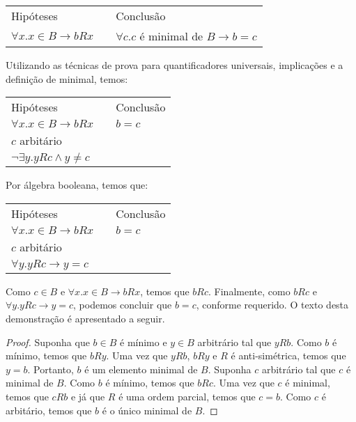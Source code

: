 \vspace{1cm}

\begin{tabular}{lcl}
 Hip\'oteses & \hspace{3cm} & Conclusão\\
 $\forall x. x \in B \rightarrow bRx$ & & $\forall c. c$ \'e minimal de $B \rightarrow b = c$\\
 \end{tabular}
\vspace{1cm}

Utilizando as t\'ecnicas de prova para quantificadores universais, implica\c{c}\~oes e a defini\c{c}\~ao de minimal, temos:

\vspace{1cm}

\begin{tabular}{lcl}
 Hip\'oteses & \hspace{3cm} & Conclusão\\
 $\forall x. x \in B \rightarrow bRx$ & & $b = c$\\
 $c$ arbit\'ario & & \\
 $\neg \exists y. yRc \land y \neq c$ & &
 \end{tabular}
\vspace{1cm}

Por \'algebra booleana, temos que:

\vspace{1cm}

\begin{tabular}{lcl}
 Hip\'oteses & \hspace{3cm} & Conclusão\\
 $\forall x. x \in B \rightarrow bRx$ & & $b = c$\\
 $c$ arbit\'ario & & \\
 $\forall y. yRc \rightarrow y = c$ & &
 \end{tabular}
\vspace{1cm}

Como $c \in B$ e $\forall x. x \in B \rightarrow bRx$, temos que $bRc$. Finalmente, como $bRc$ e  $\forall y. yRc \rightarrow y = c$,
podemos concluir que $b = c$, conforme requerido. O texto desta demonstra\c{c}\~ao \'e apresentado a seguir.

\begin{proof}
	Suponha que $b \in B$ \'e m\'inimo e $y\in B$ arbitr\'ario tal que $yRb$. Como $b$ \'e m\'inimo, temos que $bRy$. Uma vez que
	$yRb$, $bRy$ e $R$ \'e anti-sim\'etrica, temos que $y = b$. Portanto, $b$ \'e um elemento minimal de $B$.
	Suponha $c$ arbitr\'ario tal que $c$ \'e minimal de $B$. Como $b$ \'e m\'inimo, temos que $bRc$. Uma vez que $c$ \'e minimal, temos
	que $cRb$ e j\'a que $R$ \'e uma ordem parcial, temos que $c = b$. Como $c$  \'e arbit\'ario, temos que $b$ \'e o \'unico minimal de $B$.
\end{proof}

